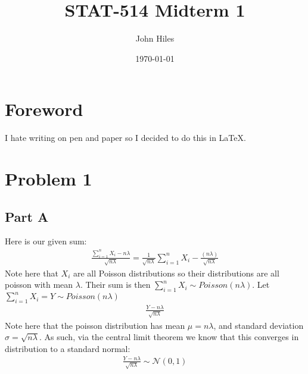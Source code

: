 \documentclass{article}
\title{STAT-514 Midterm 1}
\author{John Hiles}
\date\today
\begin{document}
\maketitle %

\section*{Foreword}
I hate writing on pen and paper so I decided to do this in LaTeX.

\section*{Problem 1}
\subsection*{Part A}
Here is our given sum:
\begin{align*}
\frac{\sum_{i=1}^{n} X_i - n\lambda}{\sqrt{n\lambda}} = \frac{1}{\sqrt{n\lambda}}\sum_{i=1}^{n} X_i - \frac{(n\lambda)}{\sqrt{n\lambda}}
\end{align*}
Note here that $X_i$ are all Poisson distributions so their distributions are all poisson with mean $\lambda$. Their sum is then $\sum_{i=1}^{n} X_i \sim Poisson(n\lambda)$. Let $\sum_{i=1}^{n} X_i=Y \sim Poisson(n\lambda)$
\begin{align*}
\frac{Y - n\lambda}{\sqrt{n\lambda}}
\end{align*}
Note here that the poisson distribution has mean $\mu=n\lambda$, and standard deviation $\sigma = \sqrt{n\lambda}$. As such, via the central limit theorem we know that this converges in distribution to a standard normal:
\begin{align*}
\boxed{ \frac{Y - n\lambda}{\sqrt{n\lambda}} \sim \mathcal{N}(0,1) }
\end{align*}
\end{document}

